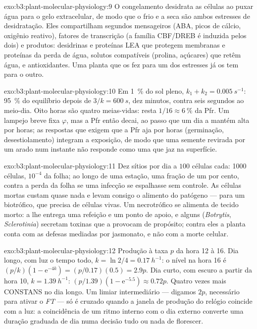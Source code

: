 \begin{solution}{exo:b3:plant-molecular-physiology:9}
O congelamento desidrata as células ao puxar água para o gelo
extracelular, de modo que o frio e a seca são ambos estresses de
desidratação. Eles compartilham segundos mensageiros (ABA, picos de
cálcio, oxigênio reativo), fatores de transcrição (a família CBF/DREB é
induzida pelos dois) e produtos: desidrinas e proteínas LEA que protegem
membranas e proteínas da perda de água, solutos compatíveis (prolina,
açúcares) que retêm água, e antioxidantes. Uma planta que os fez para um
dos estresses já os tem para o outro.
\end{solution}

\begin{solution}{exo:b3:plant-molecular-physiology:10}
Em \qty{1}{\%} do sol pleno, $k_{1} + k_{2} = \qty{0.005}{s^{-1}}$:
95~\% do equilíbrio depois de $3/k = \qty{600}{s}$, dez minutos, contra
seis segundos ao meio-dia. Oito horas são quatro meias-vidas: resta
$1/16 \approx
\qty{6}{\%}$ da Pfr. Um lampejo breve fixa $\varphi$, mas a
Pfr então decai, ao passo que um dia a mantém alta por horas; as
respostas que exigem que a Pfr aja por horas (germinação,
desestiolamento) integram a exposição, de modo que uma semente revirada
por um arado num instante não responde como uma que jaz na superfície.
\end{solution}

\begin{solution}{exo:b3:plant-molecular-physiology:11}
Dez sítios por dia a $100$ células cada: \num{1000} células, $10^{-4}$ da
folha; ao longo de uma estação, uma fração de um por cento, contra a
perda da folha se uma infecção se espalhasse sem controle. As células
mortas custam quase nada e levam consigo o alimento do patógeno --- para
um biotrófico, que precisa de células vivas. Um necrotrófico se alimenta
de tecido morto: a  lhe entrega uma refeição e um
ponto de apoio, e alguns (\emph{Botrytis}, \emph{Sclerotinia}) secretam
toxinas que a provocam de propósito; contra eles a planta conta com as
defesas mediadas por jasmonato, e não com a morte celular.
\end{solution}

\begin{solution}{exo:b3:plant-molecular-physiology:12}
Produção à taxa $p$ da hora 12 à 16. Dia longo, com luz o tempo todo,
$k = \ln 2/4 = \qty{0.17}{h^{-1}}$: o nível na hora 16 é $(p/k)(1 -
\mathrm{e}^{-4k}) = (p/0.17)(0.5) = 2.9p$. Dia curto, com escuro a partir
da hora 10, $k = \qty{1.39}{h^{-1}}$: $(p/1.39)(1 - \mathrm{e}^{-5.5})
\approx 0.72p$. Quatro vezes mais CONSTANS no dia longo. Um limiar
intermediário --- digamos $2p$, necessário para ativar o \emph{FT} --- só
é cruzado quando a janela de produção do relógio coincide com a luz: a
coincidência de um ritmo interno com o dia externo converte uma duração
graduada de dia numa decisão tudo ou nada de florescer.
\end{solution}

